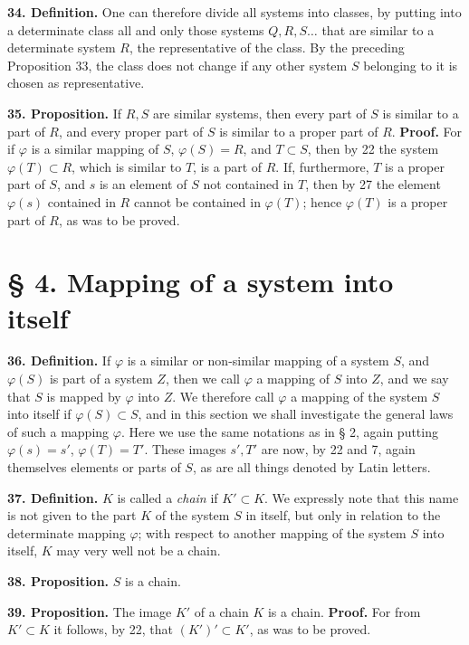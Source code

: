 \documentclass[11pt]{article}
\newcommand{\partof}{\mathrel{\subset}}
\begin{document}
\noindent\textbf{34. Definition.} One can therefore divide all systems into classes, by putting into a determinate class all and only those systems $Q,R,S\ldots$ that are similar to a determinate system $R$, the representative of the class. By the preceding Proposition 33, the class does not change if any other system $S$ belonging to it is chosen as representative.

\noindent\textbf{35. Proposition.} If $R,S$ are similar systems, then every part of $S$ is similar to a part of $R$, and every proper part of $S$ is similar to a proper part of $R$. \textbf{Proof.} For if $\varphi$ is a similar mapping of $S$, $\varphi(S)=R$, and $T\partof S$, then by 22 the system $\varphi(T)\partof R$, which is similar to $T$, is a part of $R$. If, furthermore, $T$ is a proper part of $S$, and $s$ is an element of $S$ not contained in $T$, then by 27 the element $\varphi(s)$ contained in $R$ cannot be contained in $\varphi(T)$; hence $\varphi(T)$ is a proper part of $R$, as was to be proved.

\section*{§ 4. Mapping of a system into itself}

\noindent\textbf{36. Definition.} If $\varphi$ is a similar or non-similar mapping of a system $S$, and $\varphi(S)$ is part of a system $Z$, then we call $\varphi$ a mapping of $S$ into $Z$, and we say that $S$ is mapped by $\varphi$ into $Z$. We therefore call $\varphi$ a mapping of the system $S$ into itself if $\varphi(S)\partof S$, and in this section we shall investigate the general laws of such a mapping $\varphi$. Here we use the same notations as in § 2, again putting $\varphi(s)=s'$, $\varphi(T)=T'$. These images $s',T'$ are now, by 22 and 7, again themselves elements or parts of $S$, as are all things denoted by Latin letters.

\noindent\textbf{37. Definition.} $K$ is called a \emph{chain} if $K'\partof K$. We expressly note that this name is not given to the part $K$ of the system $S$ in itself, but only in relation to the determinate mapping $\varphi$; with respect to another mapping of the system $S$ into itself, $K$ may very well not be a chain.

\noindent\textbf{38. Proposition.} $S$ is a chain.

\noindent\textbf{39. Proposition.} The image $K'$ of a chain $K$ is a chain. \textbf{Proof.} For from $K'\partof K$ it follows, by 22, that $(K')'\partof K'$, as was to be proved.
\end{document}
